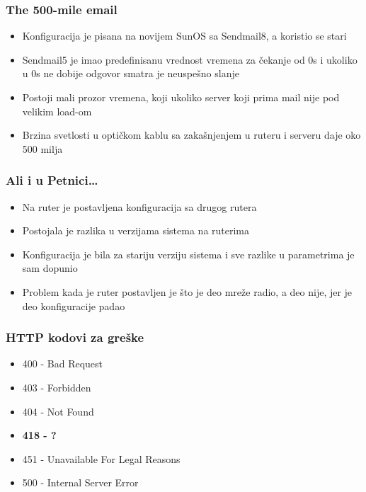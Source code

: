 \documentclass{beamer}
\begin{document}
\begin{frame}
    \frametitle{The 500-mile email}
    \begin{itemize}
        \item Konfiguracija je pisana na novijem SunOS sa Sendmail8, a koristio se stari \newline
        \item Sendmail5 je imao predefinisanu vrednost vremena za čekanje od 0s i ukoliko u 0s ne dobije odgovor smatra je neuspešno slanje \newline
        \item Postoji mali prozor vremena, koji ukoliko server koji prima mail nije pod velikim load-om \newline
        \item Brzina svetlosti u optičkom kablu sa zakašnjenjem u ruteru i serveru daje oko 500 milja 
    \end{itemize}
\end{frame}

\begin{frame}
    \frametitle{Ali i u Petnici\dots}
    \begin{itemize}
        \item Na ruter je postavljena konfiguracija sa drugog rutera \newline
        \item Postojala je razlika u verzijama sistema na ruterima \newline
        \item Konfiguracija je bila za stariju verziju sistema i sve razlike u parametrima je sam dopunio \newline
        \item Problem kada je ruter postavljen je što je deo mreže radio, a deo nije, jer je deo konfiguracije padao
    \end{itemize}
\end{frame}

\begin{frame}
    \frametitle{HTTP kodovi za greške}
    \begin{itemize}
        \item 400 - Bad Request \newline
        \item 403 - Forbidden \newline
        \item 404 - Not Found \newline
        \item \textbf{418 - ?} \newline
        \item 451 - Unavailable For Legal Reasons \newline
        \item 500 - Internal Server Error \newline    
    \end{itemize}
\end{frame}
\end{document}
